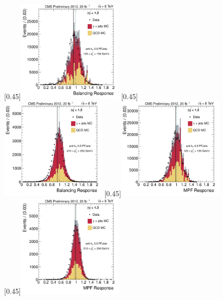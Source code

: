\begin{figure}[p]
    \centering
    \subcaptionbox{\label{fig:bal_eta013_pt_125_155}}[0.45\textwidth]{\includegraphics[width=0.45\textwidth]{chapitre4/figs/resp_balancing_eta013_ptPhot_125_155.pdf}}\hfill
    \subcaptionbox{\label{fig:bal_eta013_pt_210_250}}[0.45\textwidth]{\includegraphics[width=0.45\textwidth]{chapitre4/figs/resp_balancing_eta013_ptPhot_210_250.pdf}}
    \subcaptionbox{\label{fig:mpf_eta013_pt_125_155}}[0.45\textwidth]{\includegraphics[width=0.45\textwidth]{chapitre4/figs/resp_mpf_eta013_ptPhot_125_155.pdf}}\hfill
    \subcaptionbox{\label{fig:mpf_eta013_pt_210_250}}[0.45\textwidth]{\includegraphics[width=0.45\textwidth]{chapitre4/figs/resp_mpf_eta013_ptPhot_210_250.pdf}}

\end{figure}
